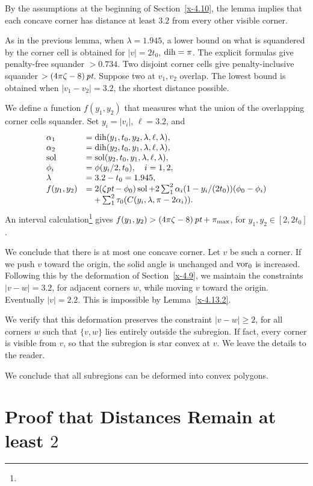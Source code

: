 By the assumptions at the beginning of Section~\ref{x-4.10}, the lemma
implies that each concave corner has distance at least $3.2$ from every
other visible corner.

As in the previous lemma, when $\lambda=1.945$, a lower bound on what is
squandered by the corner cell is obtained for  $|v|=2t_0$, $\operatorname{dih}=\pi$.
The explicit formulas give penalty-free squander $>0.734$. Two disjoint
corner cells give penalty-inclusive squander $>(4\pi\zeta-8)\,\hbox{\it pt}$.  Suppose two
at $v_1,v_2$ overlap.  The lowest bound is obtained when
$|v_1-v_2|=3.2$, the shortest distance possible.

We define a function $f(y_1,y_2)$ that measures what the union of the
overlapping corner cells squander.  Set $y_i = |v_i|$, $\ell=3.2$, and
    $$
    \begin{array}{lll}
    \alpha_1 &= \operatorname{dih}(y_1,t_0,y_2,\lambda,\ell,\lambda),\\
    \alpha_2 &= \operatorname{dih}(y_2,t_0,y_1,\lambda,\ell,\lambda),\\
    \operatorname{sol} &= \operatorname{sol}(y_2,t_0,y_1,\lambda,\ell,\lambda),\\
    \phi_i &= \phi(y_i/2,t_0),\quad i=1,2,\\
    \lambda&=3.2-t_0=1.945,\\
    f(y_1,y_2)&=
    2(\zeta\hbox{\it pt}-\phi_0)\operatorname{sol}+
    2\sum_1^2 \alpha_i(1-y_i/(2t_0))(\phi_0-\phi_i)\\
        &\quad +\sum_1^2 \tau_0(C(y_i,\lambda,\pi-2\alpha_i)).
    \end{array}
    $$
An interval calculation\footnote{} %
gives $f(y_1,y_2)>(4\pi\zeta-8)\,\hbox{\it pt}+\pi_{\max}$, for $y_1,y_2\in[2,2t_0]$.

We conclude that there is at most one concave corner. Let $v$ be such a
corner.  If we push $v$ toward the origin, the solid angle is unchanged
and $\operatorname{vor}_0$ is increased.  Following this by the deformation of
Section~\ref{x-4.9}, we maintain the constraints $|v-w|=3.2$, for
adjacent corners $w$, while moving $v$ toward the origin. Eventually
$|v|=2.2$. This is impossible by Lemma~\ref{x-4.13.2}.

We verify that this deformation preserves the constraint $|v-w|\ge2$,
for all corners $w$ such that $\{v,w\}$ lies entirely outside the
subregion.  If fact,  every corner is visible from $v$, so that the
subregion is star convex at $v$. We leave the details to the reader.

We conclude that all subregions can be deformed into convex polygons.

\section{Proof that Distances Remain at least $2$}
    \label{sec:proof-2}


